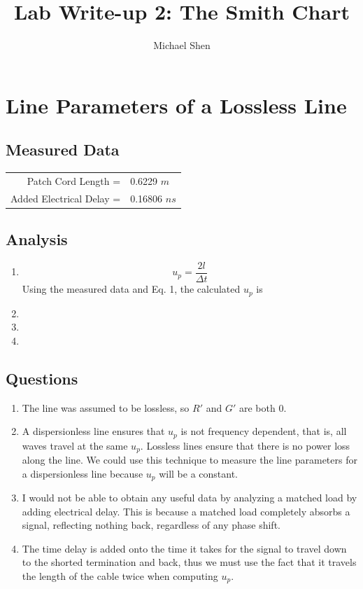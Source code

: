 \documentclass{article}
\begin{document}
\title{Lab Write-up 2: The Smith Chart}
\author{Michael Shen}
\maketitle

\section{Line Parameters of a Lossless Line}
\subsection{Measured Data}
\begin{table}[h]
\centering
	\begin{tabular}{rl}
	Patch Cord Length =  	  & 0.6229 $m$  \\
	Added Electrical Delay =  & 0.16806 $ns$      
	\end{tabular}
\end{table}
\subsection{Analysis}
\begin{enumerate}
	\item 
		\begin{equation}
			u_p = \dfrac{2l}{\Delta t}
		\end{equation}
		Using the measured data and Eq. 1, the calculated $u_p$ is 
	\item
	\item
	\item
\end{enumerate}
\subsection{Questions}
\begin{enumerate}
	\item The line was assumed to be lossless, so $R'$ and $G'$ are both 0.
	\item A dispersionless line ensures that $u_p$ is not frequency dependent, that is, all waves travel at the same $u_p$. Lossless lines ensure that there is no power loss along the line. We could use this technique to measure the line parameters for a dispersionless line because $u_p$ will be a constant.
	\item I would not be able to obtain any useful data by analyzing a matched load by adding electrical delay. This is because a matched load completely absorbs a signal, reflecting nothing back, regardless of any phase shift.
	\item The time delay is added onto the time it takes for the signal to travel down to the shorted termination and back, thus we must use the fact that it travels the length of the cable twice when computing $u_p$.
\end{enumerate}
\end{document}

